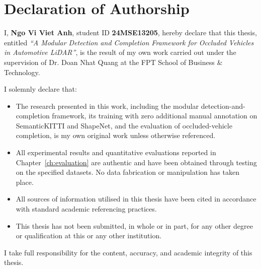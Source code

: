 \documentclass[a4paper,12pt]{report}
\begin{document}
\section*{Declaration of Authorship}
I, \textbf{Ngo Vi Viet Anh}, student ID \textbf{24MSE13205}, hereby declare that this thesis, entitled \textit{``A Modular Detection and Completion Framework for Occluded Vehicles in Automotive LiDAR''}, is the result of my own work carried out under the supervision of Dr. Doan Nhat Quang at the FPT School of Business \& Technology.

I solemnly declare that:
\begin{itemize}
    \item The research presented in this work, including the modular detection-and-completion framework, its training with zero additional manual annotation on SemanticKITTI and ShapeNet, and the evaluation of occluded-vehicle completion, is my own original work unless otherwise referenced.
    \item All experimental results and quantitative evaluations reported in Chapter~\ref{ch:evaluation} are authentic and have been obtained through testing on the specified datasets. No data fabrication or manipulation has taken place.
    \item All sources of information utilised in this thesis have been cited in accordance with standard academic referencing practices.
    \item This thesis has not been submitted, in whole or in part, for any other degree or qualification at this or any other institution.
\end{itemize}

I take full responsibility for the content, accuracy, and academic integrity of this thesis.
\clearpage

\tableofcontents
\listoffigures
\listoftables
\clearpage







\end{document}

